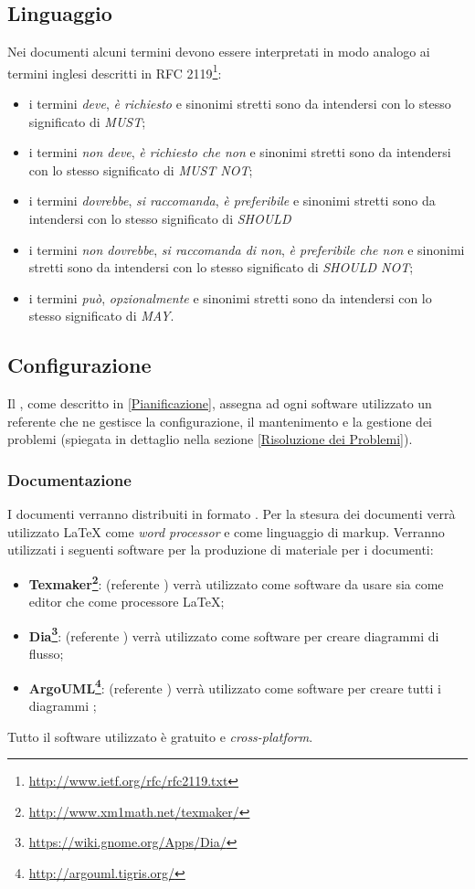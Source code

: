 \documentclass[12pt,a4paper]{article}
\begin{document}
\subsection{Linguaggio}
Nei documenti alcuni termini devono essere interpretati in modo analogo ai termini inglesi descritti in RFC 2119\footnote{\url{http://www.ietf.org/rfc/rfc2119.txt}}:
\begin{itemize}
  \item i termini \emph{deve}, \emph{è richiesto} e sinonimi stretti sono da intendersi con lo stesso significato di \emph{MUST};
  \item i termini \emph{non deve}, \emph{è richiesto che non} e sinonimi stretti sono da intendersi con lo stesso significato di \emph{MUST NOT};
  \item i  termini \emph{dovrebbe}, \emph{si raccomanda}, \emph{è preferibile} e sinonimi stretti sono da intendersi con lo stesso significato di \emph{SHOULD}
  \item i termini \emph{non dovrebbe}, \emph{si raccomanda di non}, \emph{è preferibile che non} e sinonimi stretti sono da intendersi con lo stesso significato di \emph{SHOULD NOT};
  \item i termini \emph{può}, \emph{opzionalmente} e sinonimi stretti sono da intendersi con lo stesso significato di \emph{MAY}.
\end{itemize}

\subsection{Configurazione} %
Il \PM, come descritto in \ref{Pianificazione}, assegna ad ogni software utilizzato un referente che ne gestisce la configurazione, il mantenimento e la gestione dei problemi (spiegata in dettaglio nella sezione \ref{Risoluzione dei Problemi}).

\subsubsection{Documentazione}
I documenti verranno distribuiti in formato . Per la stesura dei documenti verrà utilizzato \LaTeX{} come \emph{word processor} e come linguaggio di markup. Verranno utilizzati i seguenti software per la produzione di materiale per i documenti:
\begin{itemize}
  \item \textbf{Texmaker\footnote{\url{http://www.xm1math.net/texmaker/}}}: (referente \NDC) verrà utilizzato come software da usare sia come editor che come processore \LaTeX;
  \item \textbf{Dia\footnote{\url{https://wiki.gnome.org/Apps/Dia/}}}: (referente \TODO{}) verrà utilizzato come software per creare diagrammi di flusso;
  \item \textbf{ArgoUML\footnote{\url{http://argouml.tigris.org/}}}: (referente \TODO{}) verrà utilizzato come software per creare tutti i diagrammi ;
\end{itemize}
Tutto il software utilizzato è gratuito e \emph{cross-platform}.
\end{document}
